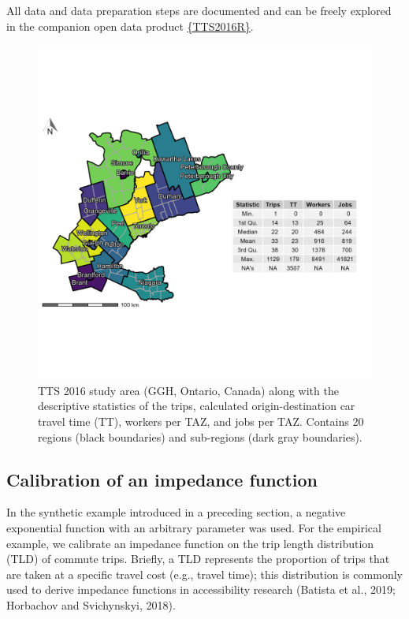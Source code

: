 \documentclass[]{elsarticle} %
\begin{document}
All data and data preparation steps are documented and can be freely
explored in the companion open data product
\href{https://github.com/soukhova/TTS2016R}{\{TTS2016R\}}.

\begin{figure}

{\centering \includegraphics[width=0.8\linewidth]{images/TTS16-survey-area} 

}

\caption{\label{fig:TTS-16-survey-area}TTS 2016 study area (GGH, Ontario, Canada) along with the descriptive statistics of the trips, calculated origin-destination car travel time (TT), workers per TAZ, and jobs per TAZ. Contains 20 regions (black boundaries) and sub-regions (dark gray boundaries).}\label{fig:TTS-16-survey-area}
\end{figure}

\hypertarget{calibration-of-an-impedance-function}{%
\subsection{Calibration of an impedance
function}\label{calibration-of-an-impedance-function}}

In the synthetic example introduced in a preceding section, a negative
exponential function with an arbitrary parameter was used. For the
empirical example, we calibrate an impedance function on the trip length
distribution (TLD) of commute trips. Briefly, a TLD represents the
proportion of trips that are taken at a specific travel cost (e.g.,
travel time); this distribution is commonly used to derive impedance
functions in accessibility research (Batista et al., 2019; Horbachov and
Svichynskyi, 2018).
\end{document}
